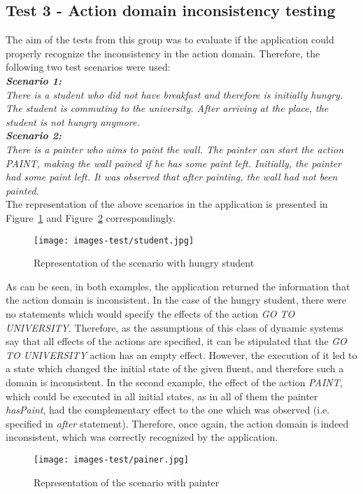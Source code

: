 \documentclass[a4paper]{article}
\begin{document}
\subsection{Test 3 - Action domain inconsistency testing}
%
The aim of the tests from this group was to evaluate if the application could properly recognize the inconsistency in the action domain. Therefore, the following two test scenarios were used:
\\[0.5\baselineskip]
\textbf{\textit{Scenario 1:}} \\
\textit{There is a student who did not have breakfast and therefore is initially hungry. The student is commuting to the university. After arriving at the place, the student is not hungry anymore.} \\[0.5\baselineskip]
\textbf{\textit{Scenario 2:}} \\
\textit{There is a painter who aims to paint the wall. The painter can start the action \textit{PAINT}, making the wall \textit{pained} if he has some paint left. Initially, the painter had some paint left. It was observed that after painting, the wall had not been painted.} \\[0.5\baselineskip]
The representation of the above scenarios in the application is presented in Figure~\ref{fig:ysp9} and Figure~\ref{fig:ysp10} correspondingly.
\begin{figure}[H]
    \centering
    \texttt{[image: images-test/student.jpg]}
    \caption{Representation of the scenario with hungry student}
    \label{fig:ysp9}
\end{figure}
As can be seen, in both examples, the application returned the information that the action domain is inconsistent. In the case of the hungry student, there were no statements which would specify the effects of the action \textit{GO TO UNIVERSITY}. Therefore, as the assumptions of this class of dynamic systems say that all effects of the actions are specified, it can be stipulated that the \textit{GO TO UNIVERSITY} action has an empty effect. However, the execution of it led to a state which changed the initial state of the given fluent, and therefore such a domain is inconsistent. In the second example, the effect of the action \textit{PAINT}, which could be executed in all initial states, as in all of them the painter \textit{hasPaint}, had the complementary effect to the one which was observed (i.e. specified in \textit{after} statement). Therefore, once again, the action domain is indeed inconsistent, which was correctly recognized by the application. 
\begin{figure}[H]
    \centering
    \texttt{[image: images-test/painer.jpg]}
    \caption{Representation of the scenario with painter}
    \label{fig:ysp10}
\end{figure}
\end{document}
